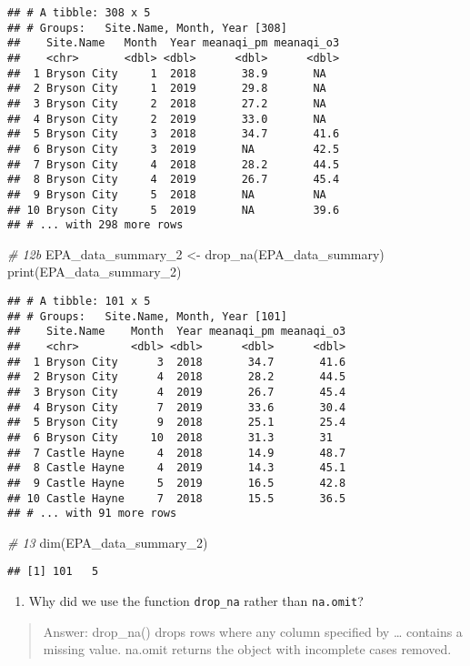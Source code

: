 \documentclass[
]{article}
\newenvironment{Shaded}{\begin{snugshade}}{\end{snugshade}}
\newcommand{\CommentTok}[1]{\textcolor[rgb]{0.56,0.35,0.01}{\textit{#1}}}
\newcommand{\FunctionTok}[1]{\textcolor[rgb]{0.00,0.00,0.00}{#1}}
\newcommand{\NormalTok}[1]{#1}
\newcommand{\OtherTok}[1]{\textcolor[rgb]{0.56,0.35,0.01}{#1}}
\providecommand{\tightlist}{%
  \setlength{\itemsep}{0pt}\setlength{\parskip}{0pt}}
\begin{document}
\begin{verbatim}
## # A tibble: 308 x 5
## # Groups:   Site.Name, Month, Year [308]
##    Site.Name   Month  Year meanaqi_pm meanaqi_o3
##    <chr>       <dbl> <dbl>      <dbl>      <dbl>
##  1 Bryson City     1  2018       38.9       NA  
##  2 Bryson City     1  2019       29.8       NA  
##  3 Bryson City     2  2018       27.2       NA  
##  4 Bryson City     2  2019       33.0       NA  
##  5 Bryson City     3  2018       34.7       41.6
##  6 Bryson City     3  2019       NA         42.5
##  7 Bryson City     4  2018       28.2       44.5
##  8 Bryson City     4  2019       26.7       45.4
##  9 Bryson City     5  2018       NA         NA  
## 10 Bryson City     5  2019       NA         39.6
## # ... with 298 more rows
\end{verbatim}

\begin{Shaded}
\begin{Highlighting}[]
\CommentTok{\# 12b}
\NormalTok{EPA\_data\_summary\_2 }\OtherTok{\textless{}{-}} \FunctionTok{drop\_na}\NormalTok{(EPA\_data\_summary)}
\FunctionTok{print}\NormalTok{(EPA\_data\_summary\_2)}
\end{Highlighting}
\end{Shaded}

\begin{verbatim}
## # A tibble: 101 x 5
## # Groups:   Site.Name, Month, Year [101]
##    Site.Name    Month  Year meanaqi_pm meanaqi_o3
##    <chr>        <dbl> <dbl>      <dbl>      <dbl>
##  1 Bryson City      3  2018       34.7       41.6
##  2 Bryson City      4  2018       28.2       44.5
##  3 Bryson City      4  2019       26.7       45.4
##  4 Bryson City      7  2019       33.6       30.4
##  5 Bryson City      9  2018       25.1       25.4
##  6 Bryson City     10  2018       31.3       31  
##  7 Castle Hayne     4  2018       14.9       48.7
##  8 Castle Hayne     4  2019       14.3       45.1
##  9 Castle Hayne     5  2019       16.5       42.8
## 10 Castle Hayne     7  2018       15.5       36.5
## # ... with 91 more rows
\end{verbatim}

\begin{Shaded}
\begin{Highlighting}[]
\CommentTok{\# 13}
\FunctionTok{dim}\NormalTok{(EPA\_data\_summary\_2)}
\end{Highlighting}
\end{Shaded}

\begin{verbatim}
## [1] 101   5
\end{verbatim}

\begin{enumerate}
\def\labelenumi{\arabic{enumi}.}
\setcounter{enumi}{13}
\tightlist
\item
  Why did we use the function \texttt{drop\_na} rather than
  \texttt{na.omit}?
\end{enumerate}

\begin{quote}
Answer: drop\_na() drops rows where any column specified by \ldots{}
contains a missing value. na.omit returns the object with incomplete
cases removed.
\end{quote}
\end{document}
